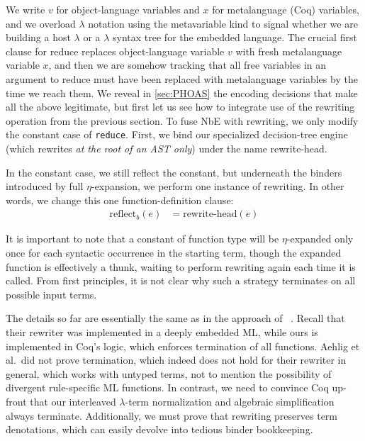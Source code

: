 \documentclass[a4paper,USenglish,cleveref,autoref,thm-restate]{lipics-v2021}
\newcommand{\citet}[1]{\usebibentry{#1}{citet}~\cite{#1}}
\newcommand{\defeq}{=}
\begin{document}
We write $v$ for object-language variables and $x$ for metalanguage (Coq) variables, and we overload $\lambda$ notation using the metavariable kind to signal whether we are building a host $\lambda$ or a $\lambda$ syntax tree for the embedded language.
The crucial first clause for reduce replaces object-language variable $v$ with fresh metalanguage variable $x$, and then we are somehow tracking that all free variables in an argument to reduce must have been replaced with metalanguage variables by the time we reach them.
We reveal in \autoref{sec:PHOAS} the encoding decisions that make all the above legitimate, but first let us see how to integrate use of the rewriting operation from the previous section.
To fuse NbE with rewriting, we only modify the constant case of \texttt{reduce}.
First, we bind our specialized decision-tree engine (which rewrites \emph{at the root of an AST only}) under the name rewrite-head.

In the constant case, we still reflect the constant, but underneath the binders introduced by full $\eta$-expansion, we perform one instance of rewriting.
In other words, we change this one function-definition clause:
\begin{align*}
  \text{reflect}_{b}(e) & \defeq \text{rewrite-head}(e)
\end{align*}

It is important to note that a constant of function type will be $\eta$-expanded only once for each syntactic occurrence in the starting term, though the expanded function is effectively a thunk, waiting to perform rewriting again each time it is called.
From first principles, it is not clear why such a strategy terminates on all possible input terms.

The details so far are essentially the same as in the approach of \citet{Aehlig}.
Recall that their rewriter was implemented in a deeply embedded ML, while ours is implemented in Coq's logic, which enforces termination of all functions.
Aehlig et al.\ did not prove termination, which indeed does not hold for their rewriter in general, which works with untyped terms, not to mention the possibility of divergent rule-specific ML functions.
In contrast, we need to convince Coq up-front that our interleaved $\lambda$-term normalization and algebraic simplification always terminate.
Additionally, we must prove that rewriting preserves term denotations, which can easily devolve into tedious binder bookkeeping.
\end{document}
